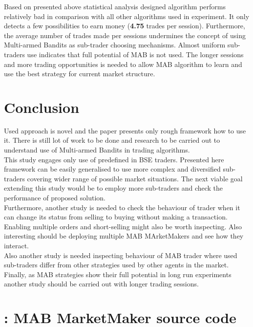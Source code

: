 \documentclass{llncs}
\begin{document}
Based on presented above statistical analysis designed algorithm performs relatively bad in comparison with all other algorithms used in experiment. It only detects a few possibilities to earn money (\textbf{4.75} trades per session). Furthermore, the average number of trades made per sessions undermines the concept of using Multi-armed Bandits as sub-trader choosing mechanisms. Almost uniform sub-traders use indicates that full potential of MAB is not used. The longer sessions and more trading opportunities is needed to allow MAB algorithm to learn and use the best strategy for current market structure.\\


\section{Conclusion}
Used approach is novel and the paper presents only rough framework how to use it. There is still lot of work to be done and research to be carried out to understand use of Multi-armed Bandits in trading algorithms.\\

This study engages only use of predefined in BSE traders. Presented here framework can be easily generalised to use more complex and diversified sub-traders covering wider range of possible market situations. The next viable goal extending this study would be to employ more sub-traders and check the performance of proposed solution.\\
Furthermore, another study is needed to check the behaviour of trader when it can change its status from selling to buying without making a transaction. Enabling multiple orders and short-selling might also be worth inspecting. Also interesting should be deploying multiple MAB MArketMakers and see how they interact.\\
Also another study is needed inspecting behaviour of MAB trader where used sub-traders differ from other strategies used by other agents in the market.\\
Finally, as MAB strategies show their full potential in long run experiments another study should be carried out with longer trading sessions.


\vfill



\newpage
\section*{\appendixname: MAB MarketMaker source code\label{app:MABmm}}
\end{document}
